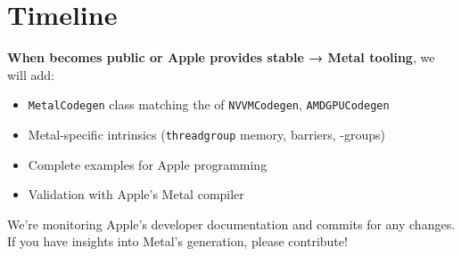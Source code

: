 \section{Timeline}

\textbf{When  becomes public or Apple provides stable   → Metal tooling}, we will add:

\begin{itemize}[noitemsep]
  \item \texttt{MetalCodegen} class matching the  of \texttt{NVVMCodegen}, \texttt{AMDGPUCodegen}
  \item Metal-specific intrinsics (\texttt{threadgroup} memory, barriers, -groups)
  \item Complete examples for Apple  programming
  \item Validation with Apple's Metal compiler
\end{itemize}

We're monitoring Apple's developer documentation and  commits for any changes. If you have insights into Metal's  generation, please contribute!

